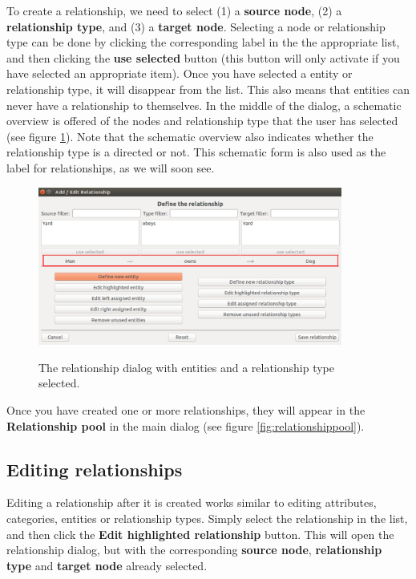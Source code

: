 \documentclass{memoir}
\begin{document}
To create a relationship, we need to select (1) a \textbf{source node}, (2) a \textbf{relationship type}, and (3) a \textbf{target node}. Selecting a node or relationship type can be done by clicking the corresponding label in the the appropriate list, and then clicking the \textbf{use selected} button (this button will only activate if you have selected an appropriate item). Once you have selected a entity or relationship type, it will disappear from the list. This also means that entities can never have a relationship to themselves. 
In the middle of the dialog, a schematic overview is offered of the nodes and relationship type that the user has selected (see figure \ref{fig:relationshipdialog3}). Note that the schematic overview also indicates whether the relationship type is a directed or not. This schematic form is also used as the label for relationships, as we will soon see.

\begin{figure}[h!]
  \centering
  \caption{The relationship dialog with entities and a relationship type selected.}
  \includegraphics[width=100mm]{Screenshot_20.pdf}
  \label{fig:relationshipdialog3}
\end{figure}

Once you have created one or more relationships, they will appear in the \textbf{Relationship pool} in the main dialog (see figure \ref{fig:relationshippool}).

\subsection{Editing relationships}
\label{sec:editingrelationships}

Editing a relationship after it is created works similar to editing attributes, categories, entities or relationship types. Simply select the relationship in the list, and then click the \textbf{Edit highlighted relationship} button. This will open the relationship dialog, but with the corresponding \textbf{source node}, \textbf{relationship type} and \textbf{target node} already selected.
\end{document}
